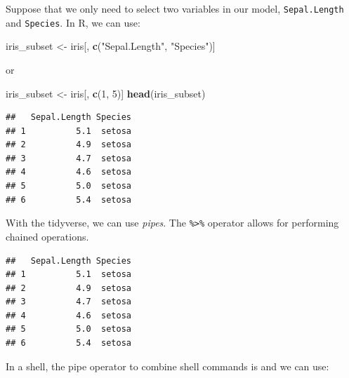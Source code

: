 \documentclass[]{book}
\newenvironment{Shaded}{\begin{snugshade}}{\end{snugshade}}
\newcommand{\KeywordTok}[1]{\textcolor[rgb]{0.13,0.29,0.53}{\textbf{#1}}}
\newcommand{\DecValTok}[1]{\textcolor[rgb]{0.00,0.00,0.81}{#1}}
\newcommand{\StringTok}[1]{\textcolor[rgb]{0.31,0.60,0.02}{#1}}
\newcommand{\OperatorTok}[1]{\textcolor[rgb]{0.81,0.36,0.00}{\textbf{#1}}}
\newcommand{\NormalTok}[1]{#1}
\theoremstyle{definition}
\theoremstyle{definition}
\theoremstyle{definition}
\theoremstyle{remark}
\begin{document}
Suppose that we only need to select two variables in our model,
\texttt{Sepal.Length} and \texttt{Species}. In R, we can use:

\begin{Shaded}
\begin{Highlighting}[]
\NormalTok{iris_subset <-}\StringTok{ }\NormalTok{iris[, }\KeywordTok{c}\NormalTok{(}\StringTok{"Sepal.Length"}\NormalTok{, }\StringTok{"Species"}\NormalTok{)]}
\end{Highlighting}
\end{Shaded}

or

\begin{Shaded}
\begin{Highlighting}[]
\NormalTok{iris_subset <-}\StringTok{ }\NormalTok{iris[, }\KeywordTok{c}\NormalTok{(}\DecValTok{1}\NormalTok{, }\DecValTok{5}\NormalTok{)]}
\KeywordTok{head}\NormalTok{(iris_subset)}
\end{Highlighting}
\end{Shaded}

\begin{verbatim}
##   Sepal.Length Species
## 1          5.1  setosa
## 2          4.9  setosa
## 3          4.7  setosa
## 4          4.6  setosa
## 5          5.0  setosa
## 6          5.4  setosa
\end{verbatim}

With the tidyverse, we can use \emph{pipes}. The
\texttt{\%\textgreater{}\%} operator allows for performing chained
operations.

\begin{Shaded}
\end{Shaded}

\begin{verbatim}
##   Sepal.Length Species
## 1          5.1  setosa
## 2          4.9  setosa
## 3          4.7  setosa
## 4          4.6  setosa
## 5          5.0  setosa
## 6          5.4  setosa
\end{verbatim}

In a shell, the pipe operator to combine shell commands is
\texttt{\textbar{}} and we can use:
\end{document}
